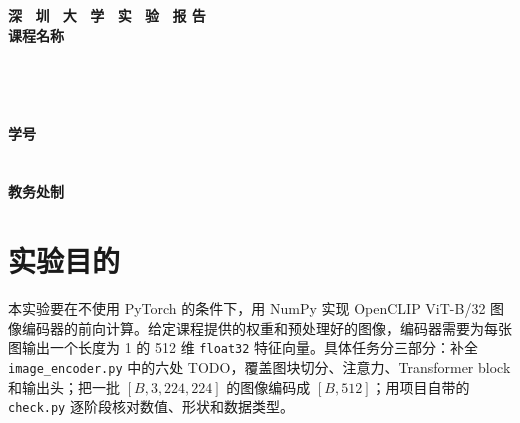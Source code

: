 \documentclass[a4paper,12pt]{article}
\begin{document}
\begin{titlepage}
    \centering
    \vspace*{2cm}
    \Huge{\textbf{深 \ 圳 \ 大 \ 学 \ 实 \ 验  \ 报 告}}\\[1.5cm]
    
    {\Large\textbf{课程名称}\quad\underline{}}\\[0.5cm]
{\Large
\noindent{}
\underline{}}\\[0.5cm]
{\Large
\noindent{}
\underline{}}\\[0.5cm]
{\Large
\noindent{}
\underline{}}\\[0.5cm]
{\Large
\noindent{}
\underline{}}\\[0.5cm]
{\Large
\noindent{}
\underline{}
\hspace{0.5cm}
\textbf{学号}
\underline{}}\\[0.5cm]
{\Large
\noindent{}
\underline{}}\\[0.5cm]
{\Large
\noindent{}
\underline{}}\\[1.5cm]

    \vfill
    \Large{\textbf{教务处制}}
\end{titlepage}

\newpage


\section{实验目的}

本实验要在不使用 PyTorch 的条件下，用 NumPy 实现 OpenCLIP ViT-B/32 图像编码器的前向计算。给定课程提供的权重和预处理好的图像，编码器需要为每张图输出一个长度为 1 的 512 维 \texttt{float32} 特征向量。具体任务分三部分：补全 \texttt{image\_encoder.py} 中的六处 TODO，覆盖图块切分、注意力、Transformer block 和输出头；把一批 $[B,3,224,224]$ 的图像编码成 $[B,512]$；用项目自带的 \texttt{check.py} 逐阶段核对数值、形状和数据类型。
\end{document}
